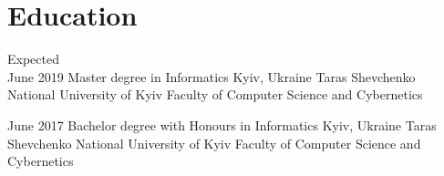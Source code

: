 \documentclass[letterpaper]{twentysecondcv} %
\begin{document}
\makeprofile %

\section{Education}

\begin{twenty} %
	\twentyitem
    	{Expected \\ June 2019}
        {Master degree in Informatics}
        {Kyiv, Ukraine}
        {Taras Shevchenko National University of Kyiv}
        {Faculty of Computer Science and Cybernetics}
        
	\twentyitem
    	{June 2017}
        {Bachelor degree with Honours in Informatics}
        {Kyiv, Ukraine}
        {Taras Shevchenko National University of Kyiv}
        {Faculty of Computer Science and Cybernetics}
        
\end{twenty}


\end{document}
